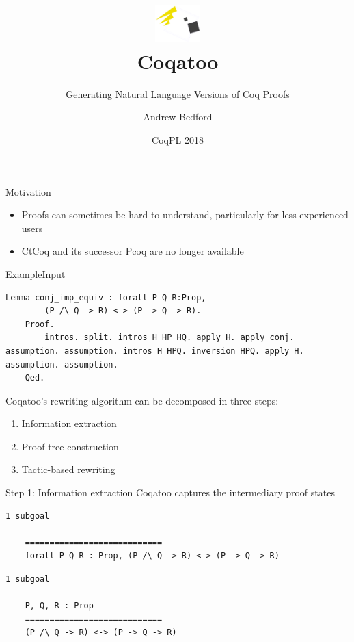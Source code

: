 \documentclass[pdf]{beamer}
\title[Coqatoo]{\includegraphics[width=50pt]{images/logo.png}\\Coqatoo}
\subtitle{Generating Natural Language Versions of Coq Proofs}
\author{Andrew Bedford}
\institute{Laval University}
\date{CoqPL 2018}
\begin{document}
\begin{frame}
    \titlepage
\end{frame}

\begin{frame}{Motivation}
    \begin{itemize}
        \item Proofs can sometimes be hard to understand, particularly for less-experienced users
        \item CtCoq and its successor Pcoq are no longer available
    \end{itemize}
\end{frame}

\begin{frame}[fragile]{Example}{Input}
    \begin{lstlisting}[label=listing:input]
    Lemma conj_imp_equiv : forall P Q R:Prop, 
        (P /\ Q -> R) <-> (P -> Q -> R).
    Proof.
        intros. split. intros H HP HQ. apply H. apply conj. assumption. assumption. intros H HPQ. inversion HPQ. apply H. assumption. assumption.
    Qed.
    \end{lstlisting}
\end{frame}

\begin{frame}
    Coqatoo’s rewriting algorithm can be decomposed in three steps:
    \begin{enumerate}
        \item Information extraction
        \item Proof tree construction
        \item Tactic-based rewriting
    \end{enumerate}
\end{frame}


\begin{frame}[fragile]{Step 1: Information extraction}
    Coqatoo captures the intermediary proof states
    \begin{lstlisting}[label=listing:before-intros, captionpos=b,caption={State before executing the first intros tactic}]
    1 subgoal

    ============================
    forall P Q R : Prop, (P /\ Q -> R) <-> (P -> Q -> R)
    \end{lstlisting}

    \begin{lstlisting}[label=listing:after-intros,captionpos=b,caption={State after executing the first intros tactic}]
    1 subgoal

    P, Q, R : Prop
    ============================
    (P /\ Q -> R) <-> (P -> Q -> R)
    \end{lstlisting}
\end{frame}
\end{document}
